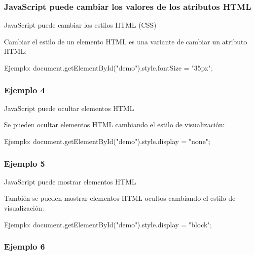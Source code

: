 \begin{frame}[fragile]
  \frametitle{JavaScript puede cambiar los valores de los atributos HTML}
  
\end{frame}

\begin{frame}[c]{JavaScript puede cambiar los estilos HTML (CSS)}

  Cambiar el estilo de un elemento HTML es una variante de cambiar un atributo HTML:

  \vspace{\baselineskip}
  \begin{exampleblock}{Ejemplo:}
    document.getElementById("demo").style.fontSize = "35px";
  \end{exampleblock}
\end{frame}

\begin{frame}[fragile]
  \frametitle{Ejemplo 4}
  
\end{frame}

\begin{frame}[c]{JavaScript puede ocultar elementos HTML}

  Se pueden ocultar elementos HTML cambiando el estilo de visualización:

  \vspace{\baselineskip}
  \begin{exampleblock}{Ejemplo:}
    document.getElementById("demo").style.display = "none"; 
  \end{exampleblock}
\end{frame}

\begin{frame}[fragile]
  \frametitle{Ejemplo 5}
  
\end{frame}

\begin{frame}[c]{JavaScript puede mostrar elementos HTML}

  También se pueden mostrar elementos HTML ocultos cambiando el estilo
  de visualización: 

  \vspace{\baselineskip}
  \begin{exampleblock}{Ejemplo:}
    document.getElementById("demo").style.display = "block";
  \end{exampleblock}
\end{frame}

\begin{frame}[fragile]
  \frametitle{Ejemplo 6}
  
\end{frame}
